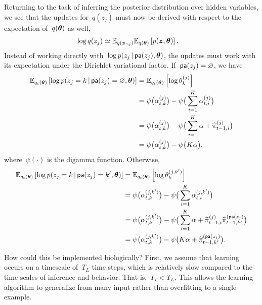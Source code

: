 Returning to the task of inferring the posterior distribution over
hidden variables, we see that the updates for~$q(z_j)$ must now
be derived with respect to the expectation of~$q(\boldsymbol{\theta})$ as well,
\begin{align}
  \log q(z_j) &\simeq \mathbb{E}_{q(\boldsymbol{z}_{\neg j})} \mathbb{E}_{q(\boldsymbol{\theta})} \left[ p(\boldsymbol{z}, \boldsymbol{\theta}) \right].
\end{align}
Instead of working directly with~$\log p(z_j \,|\, \mathsf{pa}(z_j), \boldsymbol{\theta})$,
the updates must work with its expectation under the Dirichlet
variational factor. If~$\mathsf{pa}(z_j)=\varnothing$, we have
\begin{align}
  \mathbb{E}_{q_t(\boldsymbol{\theta})} \left[\log p(z_j=k \,|\, \mathsf{pa}(z_j)=\varnothing, \boldsymbol{\theta})\right]
  &= \mathbb{E}_{q_t(\boldsymbol{\theta})} \left[\log \theta_{k}^{(j)} \right] \\
  \label{eq:expected_log_theta}
  &= \psi\big(\alpha_{t,k}^{(j)}\big)
  - \psi\big(\sum_{i=1}^K \alpha_{t,i}^{(j)} \big) \\
  &= \psi\big(\alpha_{t,k}^{(j)}\big)
  - \psi\big(\sum_{i=1}^K \alpha + \widehat{\pi}_{t-1,i}^{(j)} \big) \\
  &= \psi\big(\alpha_{t,k}^{(j)}\big)
  - \psi\big(K\alpha\big).
\end{align}
where~$\psi(\cdot)$ is the digamma function. Otherwise,
\begin{align}
  \mathbb{E}_{q_t(\boldsymbol{\theta})} \left[\log p(z_j=k \,|\, \mathsf{pa}(z_j)=k', \boldsymbol{\theta})\right]
  &= \mathbb{E}_{q_t(\boldsymbol{\theta})} \left[\log \theta_{k}^{(j,k')} \right] \\
  \label{eq:expected_log_theta}
  &= \psi\big(\alpha_{t,k}^{(j,k')}\big)
  - \psi\big(\sum_{i=1}^K \alpha_{t,i}^{(j,k')} \big) \\
  &= \psi\big(\alpha_{t,k}^{(j,k')}\big)
  - \psi\big(\sum_{i=1}^K \alpha + \widehat{\pi}_{t-1,i}^{(j)} \widehat{\pi}_{t-1,k'}^{(\mathsf{pa}(z_j)} \big) \\
  &= \psi\big(\alpha_{t,k}^{(j,k')}\big)
  - \psi\big(K\alpha + \widehat{\pi}_{t-1,k'}^{(\mathsf{pa}(z_j)} \big).
\end{align}

How could this be implemented biologically?
First, we assume that learning occurs on a 
timescale of~$T_L$ time steps, which is relatively slow compared to
the time scales of inference and behavior. That is,~$T_I < T_L$.
This allows the learning algorithm to generalize from many
input rather than overfitting to a single example.

